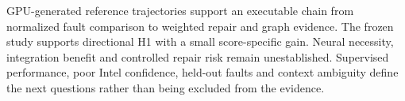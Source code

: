 GPU-generated reference trajectories support an executable chain from normalized fault comparison to weighted repair and graph evidence. The frozen study supports directional H1 with a small score-specific gain. Neural necessity, integration benefit and controlled repair risk remain unestablished. Supervised performance, poor Intel confidence, held-out faults and context ambiguity define the next questions rather than being excluded from the evidence.
